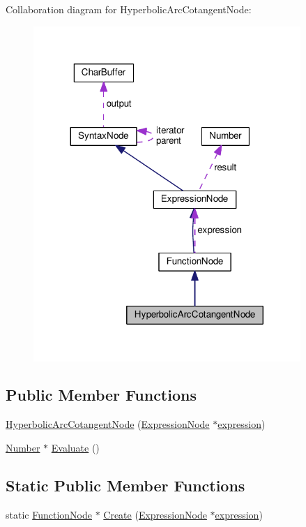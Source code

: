 Collaboration diagram for Hyperbolic\+Arc\+Cotangent\+Node\+:
\nopagebreak
\begin{figure}[H]
\begin{center}
\leavevmode
\includegraphics[width=287pt]{df/d8f/classHyperbolicArcCotangentNode__coll__graph}
\end{center}
\end{figure}
\subsection*{Public Member Functions}
\begin{DoxyCompactItemize}
\item 
\hyperlink{classHyperbolicArcCotangentNode_aeb8d5f5d7f623a6f2c0da363e0eec026}{Hyperbolic\+Arc\+Cotangent\+Node} (\hyperlink{classExpressionNode}{Expression\+Node} $\ast$\hyperlink{classFunctionNode_ad7577b179a1937aaf8a0058bb5b546dc}{expression})
\item 
\hyperlink{structNumber}{Number} $\ast$ \hyperlink{classHyperbolicArcCotangentNode_a517890860c5161dae48ef8e26b952144}{Evaluate} ()
\end{DoxyCompactItemize}
\subsection*{Static Public Member Functions}
\begin{DoxyCompactItemize}
\item 
static \hyperlink{classFunctionNode}{Function\+Node} $\ast$ \hyperlink{classHyperbolicArcCotangentNode_a51c29b7be38fc24686add16377b6d883}{Create} (\hyperlink{classExpressionNode}{Expression\+Node} $\ast$\hyperlink{classFunctionNode_ad7577b179a1937aaf8a0058bb5b546dc}{expression})
\end{DoxyCompactItemize}

